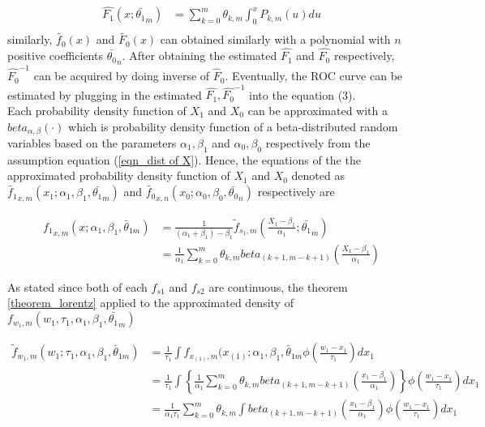 \begin{equation}
\begin{split}
   \hat{F_1}(x;\bar{\theta_1}_m) &= \sum_{k=0}^{m}\theta_{k,m}\int_0^x P_{k,m}(u)du \\
\end{split}
\end{equation}
similarly, $\tilde{f_0}(x)$ and $\tilde{F_0}(x)$ can obtained similarly with a polynomial with $n$ positive coefficients $\bar{\theta_0}_n$. After obtaining the estimated $\hat{F_1}$ and $\hat{F_0}$ respectively, $\hat{F_0}^{-1}$ can be acquired by doing inverse of $\hat{F}_0$. Eventually, the ROC curve can be estimated by plugging in the estimated $\hat{F_1}, \hat{F_0}^{-1}$ into the equation (3). \\

Each probability density function of $X_1 $ and  $X_0$  can be approximated with a $beta_{\alpha, \beta}(\cdot)$ which is probability density function of a beta-distributed random variables based on the parameters $ \alpha_1, \beta_1$  and $ \alpha_0, \beta_0$ respectively from the assumption equation (\ref{eqn_dist of X}). Hence, the equations of the the approximated probability density function of $X_1$ and $X_0$ denoted as $\tilde {f_1}_{ x,m}(x_1; \alpha_1, \beta_1, \bar{\theta_1}_{m})$  and $\tilde {f_0}_{ x,n}(x_0; \alpha_0, \beta_0, \bar{\theta_0}_{n})$ respectively are

\begin{equation}
\begin{split}
  {f_1}_{x,m}(x; \alpha_1, \beta_1, \bar{\theta}_{1m}) &= \frac{1}{(\alpha_1+\beta_1)-\beta_1} \displaystyle \tilde f_{s_1,m}\left(\frac{X_1-\beta_1}{\alpha_1}; \bar{\theta_1}_{m}\right)\\
 &= \frac{1}{\alpha_1} \displaystyle \sum_{k=0}^m \theta_{k,m} beta _{(k+1, m-k+1)}\left(\frac{X_1-\beta_1}{\alpha_1}\right)
\end{split}
\end{equation}

As \cite{lorentz2013bernstein} stated since both of each $f_{s1}$ and $f_{s2}$  are continuous, the theorem \ref{theorem_lorentz} applied to the approximated density of $f_{w_1,m}(w_1, \tau_1, \alpha_1, \beta_1, \bar{\theta_1}_{m})$

\begin{equation} \label{eqn_approximation of W}
\begin{split}
\tilde f_{w_1,m}(w_1; \tau_1, \alpha_1, \beta_1, \bar \theta_{1m}) & = \frac{1}{\tau_1}\int f_{x_{(1)},m}(x_{(1)}; \alpha_1, \beta_1, \bar \theta_{1m} \phi \displaystyle\left(\frac{w_1-x_1}{\tau_1}\right) dx_1 \\
 			& = \frac{1}{\tau_1}\displaystyle \int \left \{\frac{1}{\alpha_1} \sum_{k=0}^m \theta_{k,m} beta _{(k+1, m-k+1)}\left(\frac{x_1-\beta_1}{\alpha_1}\right)\right\}\phi \displaystyle\left(\frac{w_1-x_1}{\tau_1}\right) dx_1\\
            &= \frac{1}{\alpha_1\tau_1} \displaystyle \sum_{k=0}^m \theta_{k,m} \int beta _{(k+1, m-k+1)}\left(\frac{x_1-\beta_1}{\alpha_1}\right)\phi \displaystyle\left(\frac{w_1-x_1}{\tau_1}\right) dx_1
\end{split}
\end{equation}

